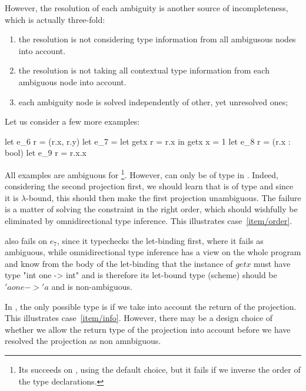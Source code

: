 \documentclass[acmsmall,screen,nonacm]{acmart}
\begin{document}
However, the resolution of each ambiguity is another source of
incompleteness, which is actually three-fold:
\begin{enumerate}
\item\label {item/order}
  the resolution is not considering type information from all ambigusous
  nodes into account.
\item\label {item/info}
  the resolution is not taking all contextual type information from
  each ambiguous node into account.
\item\label {item/simultaneous}
  each ambiguity node is solved independently of other, yet unresolved ones;
\end{enumerate}
Let us consider a few more examples:
\begin{program}[error]
let e_6 r = (r.x, r.y)
let e_7 = let getx r = r.x in getx {x = 1}
let e_8 r = (r.x : bool)
let e_9 r = r.x.x
\end{program}
All examples are ambiguous for \OCaml\footnote{Its succeeds on ,
using the default choice, but it fails if we inverse the order of the type
declarations.}.  However,  can only be of type
 in . Indeed, considering the second projection first,
we should learn that  is of type  and since it is
$\lambda$-bound, this should then make the first projection unambiguous.
The failure is a matter of solving the constraint in the right order, which
should wishfully be eliminated by omnidirectional type inference.
This illustrates case~\ref {item/order}.

\OCaml also fails on \ocaml$e_7$, since it typechecks the let-binding first,
where it fails as ambiguous, while omnidirectional type inference
has a view on the whole program and know from the body of the let-binding
that the instance of $getx$ must have type \ocaml"int one -> int" and is
therefore its let-bound type (scheme) should be \ocaml$'a one -> 'a$ and is
non-ambiguous.

In , the only possible type is  if we take into account
the return of the projection. This illustrates case~\ref {item/info}.
However, there may be a design choice of whether we allow the return type of
the projection into account before we have resolved the projection as non
amnbiguous.
\end{document}
